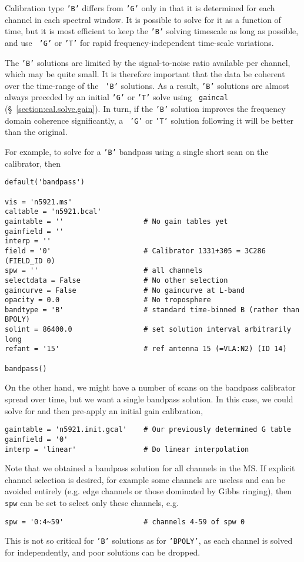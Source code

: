 Calibration type {\tt 'B'} differs from {\tt 'G'} only in that it is
determined for each channel in each spectral window.  It is possible
to solve for it as a function of time, but it is most efficient to
keep the {\tt 'B'} solving timescale as long as possible, and use {\tt
'G'} or {\tt 'T'} for rapid frequency-independent time-scale variations.

The {\tt 'B'} solutions are limited by the signal-to-noise ratio
available per channel, which may be quite small.  It is therefore
important that the data be coherent over the time-range of the {\tt
'B'} solutions.  As a result, {\tt 'B'} solutions are almost always
preceded by an initial {\tt 'G'} or {\tt 'T'} solve using {\tt
gaincal} (\S~\ref{section:cal.solve.gain}).  In turn, if the {\tt 'B'}
solution improves the frequency domain coherence significantly, a {\tt
'G'} or {\tt 'T'} solution following it will be better than the
original.

For example, to solve for a {\tt 'B'} bandpass using a single short
scan on the calibrator, then
\small
\begin{verbatim}
default('bandpass')

vis = 'n5921.ms'
caltable = 'n5921.bcal'
gaintable = ''                   # No gain tables yet
gainfield = ''
interp = ''
field = '0'                      # Calibrator 1331+305 = 3C286 (FIELD_ID 0)
spw = ''                         # all channels
selectdata = False               # No other selection
gaincurve = False                # No gaincurve at L-band
opacity = 0.0                    # No troposphere
bandtype = 'B'                   # standard time-binned B (rather than BPOLY)
solint = 86400.0                 # set solution interval arbitrarily long
refant = '15'                    # ref antenna 15 (=VLA:N2) (ID 14)

bandpass()
\end{verbatim}
\normalsize

On the other hand, we might have a number of scans on the bandpass
calibrator spread over time, but we want a single bandpass solution.
In this case, we could solve for and then pre-apply an initial gain
calibration,
\small
\begin{verbatim}
gaintable = 'n5921.init.gcal'    # Our previously determined G table
gainfield = '0'
interp = 'linear'                # Do linear interpolation
\end{verbatim}
\normalsize

Note that we obtained a bandpass solution for all channels in the MS.
If explicit channel selection is desired, for example some channels 
are useless and can be avoided entirely (e.g. edge channels or those
dominated by Gibbs ringing), then {\tt spw} can be set to select only
these channels, e.g.
\small
\begin{verbatim}
spw = '0:4~59'                   # channels 4-59 of spw 0
\end{verbatim}
\normalsize
This is not so critical for {\tt 'B'} solutions as for {\tt 'BPOLY'},
as each channel is solved for independently, and poor solutions
can be dropped.

